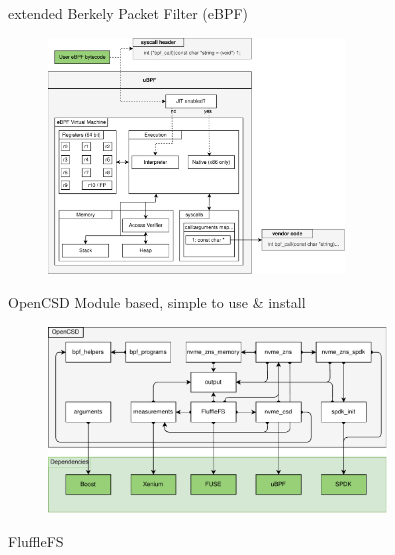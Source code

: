 \documentclass{beamer}
\begin{document}
\begin{frame}{extended Berkely Packet Filter (eBPF)}
	\begingroup
	\small
	\begin{figure}
		\centering
		\includegraphics[width=0.7\textwidth]{resources/images/ubpf-abi.pdf}
	 \end{figure}
	\endgroup
\end{frame}

\begin{frame}{OpenCSD}
	\begingroup
	\small Module based, simple to use \& install
	\begin{figure}
		\centering
		\includegraphics[width=0.8\textwidth]{resources/images/module-dependencies.pdf}
	\end{figure}
	\endgroup
\end{frame}

\begin{frame}{FluffleFS}
	\begingroup
	\endgroup
\end{frame}
\end{document}
